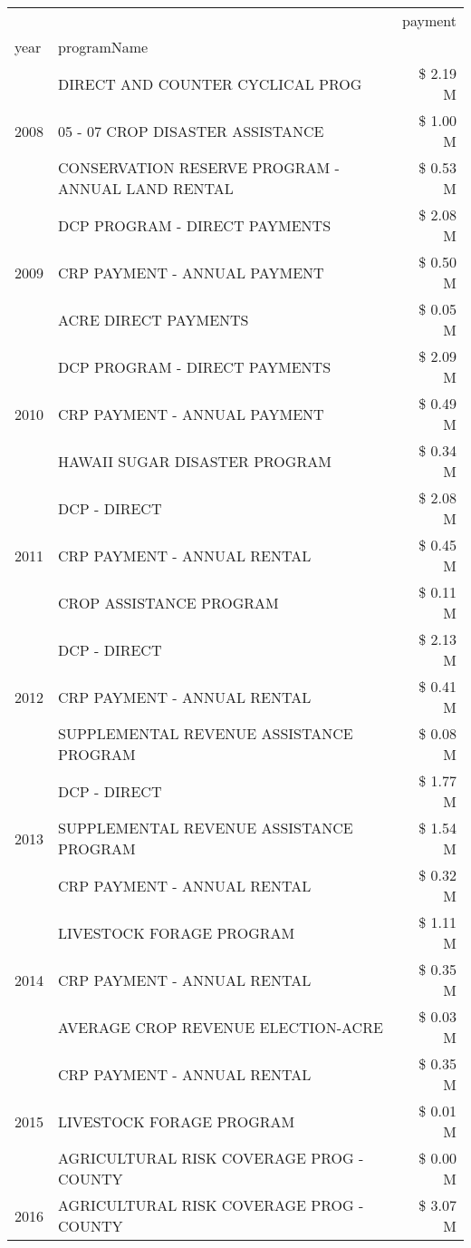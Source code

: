 \begin{tabular}{llr}
\toprule
 &  & payment \\
year & programName &  \\
\midrule
\multirow[t]{3}{*}{2008} & DIRECT AND COUNTER CYCLICAL PROG & \$ 2.19 M \\
 & 05 - 07 CROP DISASTER ASSISTANCE & \$ 1.00 M \\
 & CONSERVATION RESERVE PROGRAM - ANNUAL LAND RENTAL & \$ 0.53 M \\
\cline{1-3}
\multirow[t]{3}{*}{2009} & DCP PROGRAM - DIRECT PAYMENTS & \$ 2.08 M \\
 & CRP PAYMENT - ANNUAL PAYMENT & \$ 0.50 M \\
 & ACRE DIRECT PAYMENTS & \$ 0.05 M \\
\cline{1-3}
\multirow[t]{3}{*}{2010} & DCP PROGRAM - DIRECT PAYMENTS & \$ 2.09 M \\
 & CRP PAYMENT - ANNUAL PAYMENT & \$ 0.49 M \\
 & HAWAII SUGAR DISASTER PROGRAM & \$ 0.34 M \\
\cline{1-3}
\multirow[t]{3}{*}{2011} & DCP - DIRECT & \$ 2.08 M \\
 & CRP PAYMENT - ANNUAL RENTAL & \$ 0.45 M \\
 & CROP ASSISTANCE PROGRAM & \$ 0.11 M \\
\cline{1-3}
\multirow[t]{3}{*}{2012} & DCP - DIRECT & \$ 2.13 M \\
 & CRP PAYMENT - ANNUAL RENTAL & \$ 0.41 M \\
 & SUPPLEMENTAL REVENUE ASSISTANCE PROGRAM & \$ 0.08 M \\
\cline{1-3}
\multirow[t]{3}{*}{2013} & DCP - DIRECT & \$ 1.77 M \\
 & SUPPLEMENTAL REVENUE ASSISTANCE PROGRAM & \$ 1.54 M \\
 & CRP PAYMENT - ANNUAL RENTAL & \$ 0.32 M \\
\cline{1-3}
\multirow[t]{3}{*}{2014} & LIVESTOCK FORAGE PROGRAM & \$ 1.11 M \\
 & CRP PAYMENT - ANNUAL RENTAL & \$ 0.35 M \\
 & AVERAGE CROP REVENUE ELECTION-ACRE & \$ 0.03 M \\
\cline{1-3}
\multirow[t]{3}{*}{2015} & CRP PAYMENT - ANNUAL RENTAL & \$ 0.35 M \\
 & LIVESTOCK FORAGE PROGRAM & \$ 0.01 M \\
 & AGRICULTURAL RISK COVERAGE PROG - COUNTY & \$ 0.00 M \\
\cline{1-3}
\multirow[t]{3}{*}{2016} & AGRICULTURAL RISK COVERAGE PROG - COUNTY & \$ 3.07 M \\

\end{tabular}
